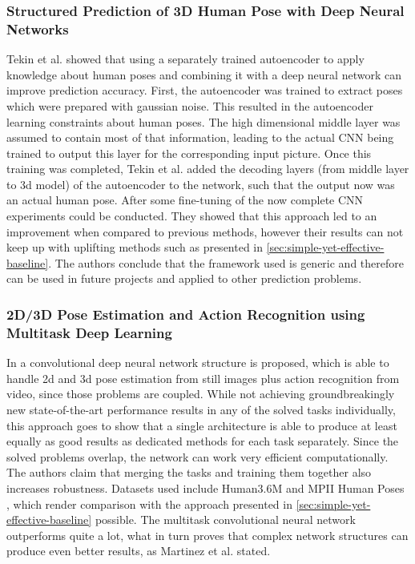\subsubsection{Structured Prediction of 3D Human Pose with Deep Neural Networks}
Tekin et al. \cite{Tekin2016} showed that using a separately trained autoencoder to apply knowledge about human poses and combining it with a deep neural network can improve prediction accuracy. First, the autoencoder was trained to extract poses which were prepared with gaussian noise. This resulted in the autoencoder learning constraints about human poses. The high dimensional middle layer was assumed to contain most of that information, leading to the actual CNN being trained to output this layer for the corresponding input picture. Once this training was completed, Tekin et al. added the decoding layers (from middle layer to 3d model) of the autoencoder to the network, such that the output now was an actual human pose. After some fine-tuning of the now complete CNN experiments could be conducted.
They showed that this approach led to an improvement when compared to previous methods, however their results can not keep up with uplifting methods such as presented in \autoref{sec:simple-yet-effective-baseline}. The authors conclude that the framework used is generic and therefore can be used in future projects and applied to other prediction problems.

\subsubsection{2D/3D Pose Estimation and Action Recognition using Multitask Deep Learning}
In \cite{Luvizon2018} a convolutional deep neural network structure is proposed, which is able to handle 2d and 3d pose estimation from still images plus action recognition from video, since those problems are coupled. While not achieving groundbreakingly new state-of-the-art performance results in any of the solved tasks individually, this approach goes to show that a single architecture is able to produce at least equally as good results as dedicated methods for each task separately. Since the solved problems overlap, the network can work very efficient computationally. The authors claim that merging the tasks and training them together also increases robustness. Datasets used include Human3.6M \cite{H3.6M} and MPII Human Poses \cite{andriluka14cvpr}, which render comparison with the approach presented in \autoref{sec:simple-yet-effective-baseline} possible. The multitask convolutional neural network outperforms \cite{Martinez_2017_ICCV} quite a lot, what in turn proves that complex network structures can produce even better results, as Martinez et al. stated.

